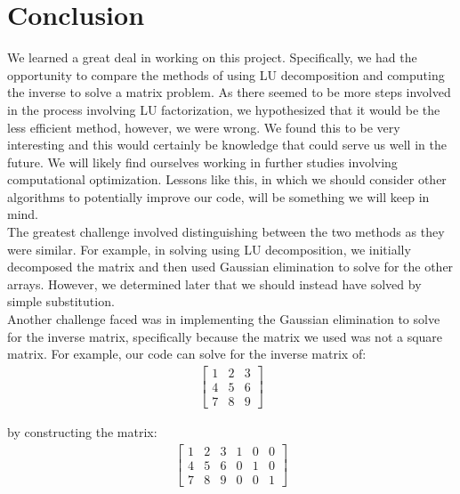 \documentclass[a4paper, 10pt]{article}
\begin{document}
\section{Conclusion}

We learned a great deal in working on this project.  Specifically, we had the opportunity to compare the methods of using LU decomposition and computing the inverse to solve a matrix problem.  As there seemed to be more steps involved in the process involving LU factorization, we hypothesized that it would be the less efficient method, however, we were wrong.  We found this to be very interesting and this would certainly be knowledge that could serve us well in the future.  We will likely find ourselves working in further studies involving computational optimization.  Lessons like this, in which we should consider other algorithms to potentially improve our code, will be something we will keep in mind.\\

\noindent The greatest challenge involved distinguishing between the two methods as they were similar.  For example, in solving using LU decomposition, we initially decomposed the matrix and then used Gaussian elimination to solve for the other arrays.  However, we determined later that we should instead have solved by simple substitution.  \\

\noindent Another challenge faced was in implementing the Gaussian elimination to solve for the inverse matrix, specifically because the matrix we used was not a square matrix.  For example, our code can solve for the inverse matrix of:\\

\begin{equation*}
\begin{matrix}
	\begin{bmatrix}
	1	& 2 &	3\\	
	4 &	5 &	6\\	
	7 &	8 &	9	
	\end{bmatrix}
\end{matrix}
\end{equation*}

\noindent by constructing the matrix:\\
\begin{equation*}
\begin{matrix}
	\begin{bmatrix}
	1  &  2  &	  3  &  1  &  0  &  0\\	
	4  &	 5  &	  6  &  0  &  1  &  0\\	
	7  &	 8  &  9  &  0  &  0  &  1
	\end{bmatrix}
\end{matrix}
\end{equation*}
\end{document}
